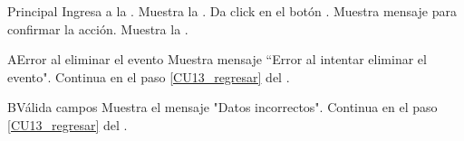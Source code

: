     \begin{UCtrayectoria}{Principal}
    \UCpaso[\UCactor] Ingresa a la .
    \UCpaso Muestra la .
    \UCpaso[\UCactor] Da click en el botón . \label{CU13_regresar} 
    \UCpaso Muestra mensaje para confirmar la acción. 
    \UCpaso Muestra la .
    \end{UCtrayectoria}
    
    \begin{UCtrayectoriaA}{A}{Error al eliminar el evento}
    	\UCpaso Muestra mensaje “Error al intentar eliminar el evento".
    	\UCpaso Continua en el paso \ref{CU13_regresar} del .
    \end{UCtrayectoriaA}

	\begin{UCtrayectoriaA}{B}{Válida campos}
		\UCpaso Muestra el mensaje "Datos incorrectos".
   		\UCpaso Continua en el paso \ref{CU13_regresar} del .
	\end{UCtrayectoriaA}

	


